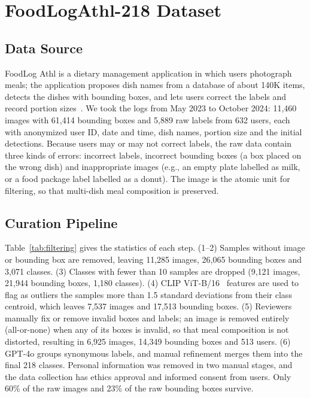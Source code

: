 \documentclass[sigconf, nonacm]{acmart}
\begin{document}
\section{FoodLogAthl-218 Dataset}
\subsection{Data Source}
FoodLog Athl is a dietary management application in which users photograph meals; the application proposes dish names from a database of about 140K items, detects the dishes with bounding boxes, and lets users correct the labels and record portion sizes~\cite{nakamoto2022foodlog}. We took the logs from May 2023 to October 2024: 11,460 images with 61,414 bounding boxes and 5,889 raw labels from 632 users, each with anonymized user ID, date and time, dish names, portion size and the initial detections. Because users may or may not correct labels, the raw data contain three kinds of errors: incorrect labels, incorrect bounding boxes (a box placed on the wrong dish) and inappropriate images (e.g., an empty plate labelled as milk, or a food package label labelled as a donut). The image is the atomic unit for filtering, so that multi-dish meal composition is preserved.

\subsection{Curation Pipeline}
Table~\ref{tab:filtering} gives the statistics of each step. (1--2) Samples without image or bounding box are removed, leaving 11,285 images, 26,065 bounding boxes and 3,071 classes. (3) Classes with fewer than 10 samples are dropped (9,121 images, 21,944 bounding boxes, 1,180 classes). (4) CLIP ViT-B/16~\cite{CLIP} features are used to flag as outliers the samples more than 1.5 standard deviations from their class centroid, which leaves 7,537 images and 17,513 bounding boxes. (5) Reviewers manually fix or remove invalid boxes and labels; an image is removed entirely (all-or-none) when any of its boxes is invalid, so that meal composition is not distorted, resulting in 6,925 images, 14,349 bounding boxes and 513 users. (6) GPT-4o groups synonymous labels, and manual refinement merges them into the final 218 classes. Personal information was removed in two manual stages, and the data collection has ethics approval and informed consent from users. Only 60\% of the raw images and 23\% of the raw bounding boxes survive.


\end{document}
